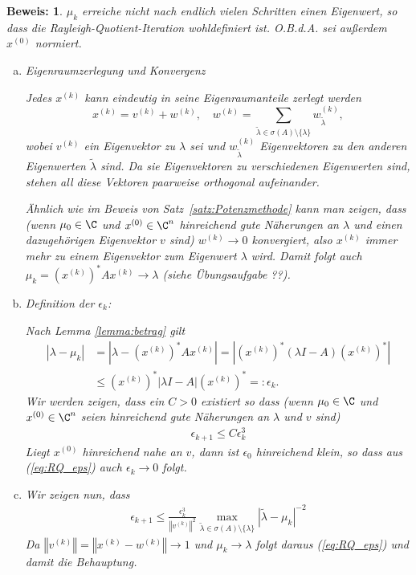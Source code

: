 \documentclass[
]{mycourse}
\theoremstyle{mythm}
\theoremstyle{break}
\newtheorem*{beweis}{Beweis:}
\newcommand{\norm}[1]{\left\Vert#1\right\Vert}		%
\newcommand{\labeq}[1]{\label{eq:#1}}			%
\newcommand{\req}[1]{(\ref{eq:#1})}
\begin{document}
\begin{beweis}
$\mu_k$ erreiche nicht nach endlich vielen Schritten einen Eigenwert, so dass die Rayleigh-Quotient-Iteration wohldefiniert ist.
O.B.d.A. sei außerdem $x^{(0)}$ normiert.

\begin{enumerate}[(a)]

\item Eigenraumzerlegung und Konvergenz

Jedes $x^{(k)}$ kann eindeutig in seine Eigenraumanteile zerlegt werden
\[
x^{(k)}= v^{(k)} + w^{(k)}, \quad w^{(k)}=\sum\limits_{\tilde \lambda\in \sigma(A)\setminus \{\lambda\} } w^{(k)}_{\tilde \lambda},
\]
wobei $v^{(k)}$ ein Eigenvektor zu $\lambda$ sei und $w^{(k)}_{\tilde \lambda}$ Eigenvektoren zu den anderen Eigenwerten $\tilde \lambda$ sind.
Da sie Eigenvektoren zu verschiedenen Eigenwerten sind, stehen all diese Vektoren paarweise orthogonal aufeinander.

Ähnlich wie im Beweis von Satz~\ref{satz:Potenzmethode} kann man zeigen, dass  
(wenn $\mu_0\in \C$ und $x^{(0)}\in \C^n$ hinreichend gute Näherungen an $\lambda$ und einen dazugehörigen Eigenvektor $v$ sind) $w^{(k)}\to 0$ konvergiert, also $x^{(k)}$ immer mehr zu einem Eigenvektor zum Eigenwert $\lambda$ wird.
Damit folgt auch $\mu_k=(x^{(k)})^* A x^{(k)}\to \lambda$ (siehe Übungsaufgabe ??).

\item Definition der $\epsilon_k$:

Nach Lemma \ref{lemma:betrag} gilt 
\begin{align*}
|\lambda - \mu_{k} | &= | \lambda - (x^{(k)})^* A x^{(k)} | = | (x^{(k)})^* (\lambda I - A ) (x^{(k)})^*|\\
&\leq  (x^{(k)})^* |\lambda I - A | (x^{(k)})^*=:\epsilon_k.
\end{align*}
Wir werden zeigen, dass ein $C>0$ existiert so dass (wenn $\mu_0\in \C$ und $x^{(0)}\in \C^n$ seien hinreichend gute Näherungen an $\lambda$ und $v$ sind)
\begin{align}\labeq{RQ_eps}
\epsilon_{k+1}\leq C \epsilon_{k}^3
\end{align}
Liegt $x^{(0)}$ hinreichend nahe an $v$, dann ist $\epsilon_0$ hinreichend klein, so dass aus \req{RQ_eps} auch $\epsilon_k\to 0$ folgt.

\item Wir zeigen nun, dass
\begin{align}\labeq{RQ_hilf}
\epsilon_{k+1} \leq  \frac{\epsilon_k^3}{\norm{v^{(k)}}^2} \max\limits_{ \tilde \lambda\in \sigma(A)\setminus \{\lambda\} } |\tilde\lambda-\mu_k|^{-2}
\end{align}
Da $\norm{v^{(k)}}=\norm{x^{(k)}-w^{(k)}} \to 1$ und $\mu_k\to \lambda$ folgt daraus \req{RQ_eps} und damit die Behauptung.


\end{enumerate}
\end{beweis}
\end{document}
